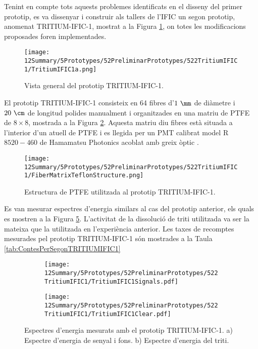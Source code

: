 Tenint en compte tots aquests problemes identificats en el disseny del primer prototip, es va dissenyar i construir als tallers de l'IFIC un segon prototip, anomenat TRITIUM-IFIC-1, mostrat a la Figura \ref{fig:TritumIFIC1s}, on totes les modificacions proposades foren implementades.
\begin{figure}[h]
\centering
\texttt{[image: 12Summary/5Prototypes/52PreliminarPrototypes/522TritiumIFIC1/TritiumIFIC1a.png]}
\caption{Vista general del prototip TRITIUM-IFIC-1.\label{fig:TritumIFIC1s}}
\end{figure}
El prototip TRITIUM-IFIC-1 consisteix en 64 fibres d'$1~\mm$ de diàmetre i $20~\cm$ de longitud polides manualment i organitzades en una matriu de PTFE de $8\times 8$, mostrada a la Figura \ref{fig:EstructuraPTFEFibresTritiumIFIC1}. Aquesta matriu diu fibres està situada a l'interior d'un atuell de PTFE i es llegida per un PMT calibrat model R$8520-460$ de Hamamatsu Photonics \cite{DataSheetPMTs} acoblat amb greix òptic \cite{OpticalGrease}.
\begin{figure}[h]
\centering
\texttt{[image: 12Summary/5Prototypes/52PreliminarPrototypes/522TritiumIFIC1/FiberMatrixTeflonStructure.png]}
\caption{Estructura de PTFE utilitzada al prototip TRITIUM-IFIC-1.\label{fig:EstructuraPTFEFibresTritiumIFIC1}}
\end{figure}
Es van mesurar espectres d'energia similars al cas del prototip anterior, els quals es mostren a la Figura \ref{fig:EspectresEnergeticsTRITIUMIFIC1}. L'activitat de la dissolució de triti utilitzada va ser la mateixa que la utilitzada en l'experiència anterior. Les taxes de recomptes mesurades pel prototip TRITIUM-IFIC-1 són mostrades a la Taula \ref{tab:ContesPerSegonTRITIUMIFIC1}

\begin{figure}
\centering
    \begin{subfigure}[b]{1\textwidth}
    \centering
    \texttt{[image: 12Summary/5Prototypes/52PreliminarPrototypes/522TritiumIFIC1/TritiumIFIC1Signals.pdf]}  
    \caption{\label{subfig:EspectreEnergeticSenyalFonsTritiumIFIC1}}
    \end{subfigure}
    \hfill
    \begin{subfigure}[b]{1\textwidth}
    \centering
    \texttt{[image: 12Summary/5Prototypes/52PreliminarPrototypes/522TritiumIFIC1/TritiumIFIC1Clear.pdf]}  
    \caption{\label{subfig:EspectreEnergeticTritiTritiumIFIC1}}
    \end{subfigure}
 \caption{Espectres d'energia mesurats amb el prototip TRITIUM-IFIC-1. a) Espectre d'energia de senyal i fons. b) Espectre d'energia del triti.}
 \label{fig:EspectresEnergeticsTRITIUMIFIC1}
\end{figure}

